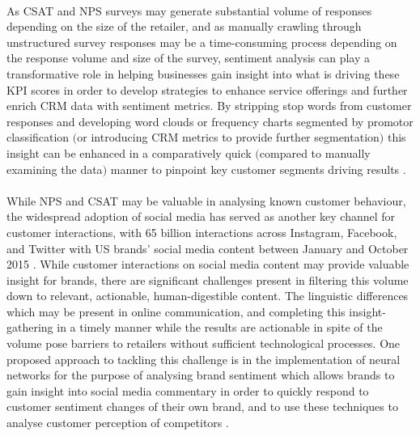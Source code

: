\documentclass[11pt]{article}
\theoremstyle{plain}
\theoremstyle{definition}
\begin{document}
\\
As CSAT and NPS surveys may generate substantial volume of responses depending on the size of the retailer, and as manually crawling through unstructured survey responses may be a time-consuming process depending on the response volume and size of the survey, sentiment analysis can play a transformative role in helping businesses gain insight into what is driving these KPI scores in order to develop strategies to enhance service offerings and further enrich CRM data with sentiment metrics. By stripping stop words from customer responses and developing word clouds or frequency charts segmented by promotor classification $($or introducing CRM metrics to provide further segmentation$)$ this insight can be enhanced in a comparatively quick $($compared to manually examining the data$)$ manner to pinpoint key customer segments driving results \cite{10.4018/IJDWM.2019100102}.\\
\\
While NPS and CSAT may be valuable in analysing known customer behaviour, the widespread adoption of social media has served as another key channel for customer interactions, with 65 billion interactions across Instagram, Facebook, and Twitter with US brands' social media content between January and October 2015 \cite{Yuki458}. While customer interactions on social media content may provide valuable insight for brands, there are significant challenges present in filtering this volume down to relevant, actionable, human-digestible content. The linguistic differences which may be present in online communication, and completing this insight-gathering in a timely manner while the results are actionable in spite of the volume pose barriers to retailers without sufficient technological processes. One proposed approach to tackling this challenge is in the implementation of neural networks for the purpose of analysing brand sentiment which allows brands to gain insight into social media commentary in order to quickly respond to customer sentiment changes of their own brand, and to use these techniques to analyse customer perception of competitors \cite{doi:10.1080/07421222.2016.1267526} \cite{IBRAHIM201932}. \\
\\
\end{document}
